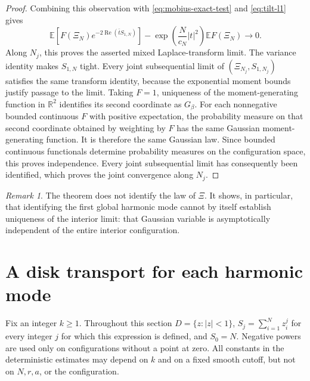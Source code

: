 \documentclass[11pt,a4paper]{article}
\numberwithin{equation}{section}
\theoremstyle{definition}
\theoremstyle{remark}
\newtheorem{remark}[theorem]{Remark}
\begin{document}
\begin{proof}
Combining this observation with \eqref{eq:mobius-exact-test} and
\eqref{eq:tilt-l1} gives
\[
 \mathbb E\left[F(\Xi_N)e^{-2\operatorname{Re}(\bar tS_{1,N})}\right]
 -\exp\left(\frac{N}{c_N}|t|^2\right)\mathbb EF(\Xi_N)
 \longrightarrow0.
\]
Along $N_j$, this proves the asserted mixed Laplace-transform limit.
The variance identity makes $S_{1,N}$ tight. Every joint subsequential
limit of $(\Xi_{N_j},S_{1,N_j})$ satisfies the same transform identity,
because the exponential moment bounds justify passage to the limit.
Taking $F=1$, uniqueness of the moment-generating function in
$\mathbb R^2$ identifies its second coordinate as $G_\beta$. For each
nonnegative bounded continuous $F$ with positive expectation, the
probability measure on that second coordinate obtained by weighting by
$F$ has the same Gaussian moment-generating function. It is therefore
the same Gaussian law. Since bounded continuous functionals determine
probability measures on the configuration space, this proves
independence. Every joint subsequential limit has consequently been
identified, which proves the joint convergence along $N_j$.
\end{proof}

\begin{remark}
The theorem does not identify the law of $\Xi$. It shows, in particular,
that identifying the first global harmonic mode cannot by itself establish
uniqueness of the interior limit: that Gaussian variable is asymptotically
independent of the entire interior configuration.
\end{remark}


\section{A disk transport for each harmonic mode}
\label{sec:higher-mode-transport}

Fix an integer $k\geq 1$. Throughout this section $D=\{z:|z|<1\}$,
$S_j=\sum_{i=1}^N z_i^j$ for every integer $j$ for which this expression
is defined, and $S_0=N$. Negative powers are used only on configurations
without a point at zero. All constants in the deterministic estimates may
depend on $k$ and on a fixed smooth cutoff, but not on $N,r,a$, or the
configuration.
\end{document}
